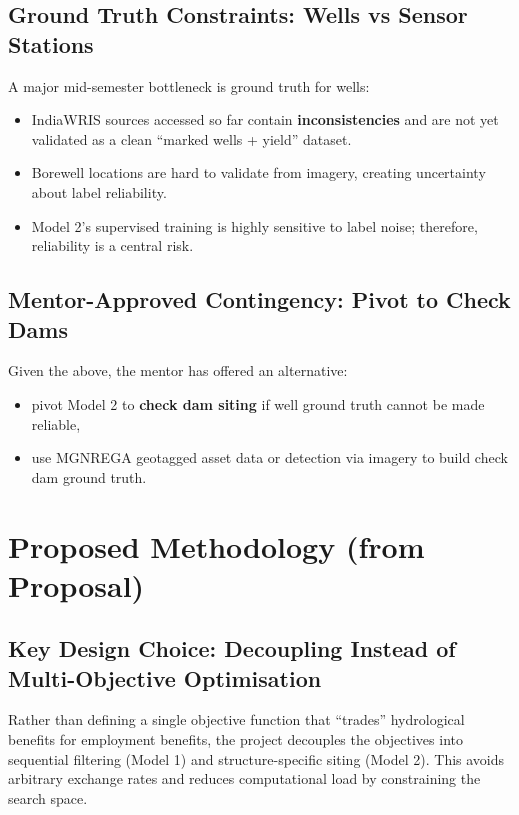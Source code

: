 \documentclass[12pt,a4paper]{report}
\begin{document}
\section{Ground Truth Constraints: Wells vs Sensor Stations}
A major mid-semester bottleneck is ground truth for wells:
\begin{itemize}
  \item IndiaWRIS sources accessed so far contain \textbf{inconsistencies} and are not yet validated as a clean “marked wells + yield” dataset.
  \item Borewell locations are hard to validate from imagery, creating uncertainty about label reliability.
  \item Model 2’s supervised training is highly sensitive to label noise; therefore, reliability is a central risk.
\end{itemize}

\section{Mentor-Approved Contingency: Pivot to Check Dams}
Given the above, the mentor has offered an alternative:
\begin{itemize}
  \item pivot Model 2 to \textbf{check dam siting} if well ground truth cannot be made reliable,
  \item use MGNREGA geotagged asset data or detection via imagery to build check dam ground truth.
\end{itemize}

\chapter{Proposed Methodology (from Proposal)}
\section{Key Design Choice: Decoupling Instead of Multi-Objective Optimisation}
Rather than defining a single objective function that “trades” hydrological benefits for employment benefits, the project decouples the objectives into sequential filtering (Model 1) and structure-specific siting (Model 2). This avoids arbitrary exchange rates and reduces computational load by constraining the search space.
\end{document}
